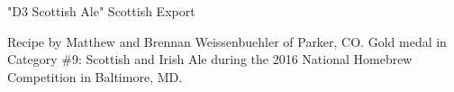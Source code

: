 \begin{recipe}{"D3 Scottish Ale" Scottish Export}

\begin{aboutblock}
Recipe by Matthew and Brennan Weissenbuehler of Parker, CO. Gold medal in
Category \#9: Scottish and Irish Ale during the 2016 National Homebrew Competition
in Baltimore, MD. \sourceaha
\end{aboutblock}


\begin{methodandtiming}

\begin{mashsteps}
\end{mashsteps}

\begin{fermentationsteps}
\end{fermentationsteps}

\end{methodandtiming}

\recipebreak

\begin{ingredientsblock}

\begin{malts}
\end{malts}

\begin{hops}
\end{hops}


\end{ingredientsblock}

\end{recipe}
